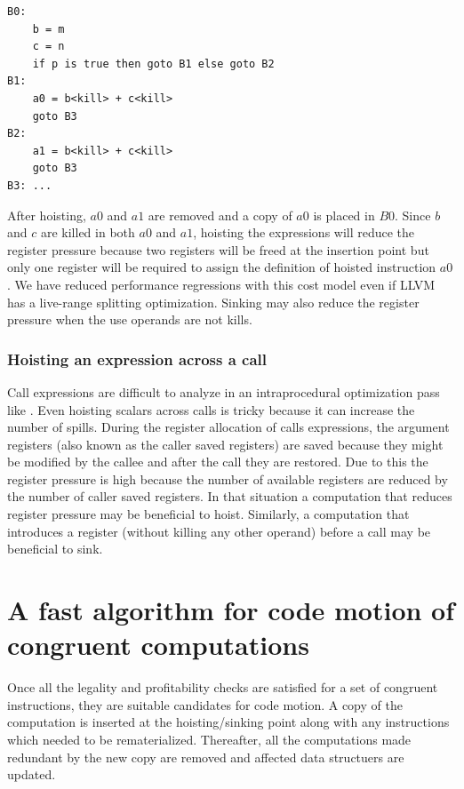 \documentclass[sigplan,10pt,review,anonymous]{acmart}\settopmatter{printfolios=true,printccs=false,printacmref=false}
\begin{document}
\begin{lstlisting}
B0:
    b = m
    c = n
    if p is true then goto B1 else goto B2
B1:
    a0 = b<kill> + c<kill>
    goto B3
B2:
    a1 = b<kill> + c<kill>
    goto B3
B3: ...
\end{lstlisting}

After hoisting, $a0$ and $a1$ are removed and a copy of $a0$ is placed in
$B0$. Since $b$ and $c$ are killed in both $a0$ and $a1$, hoisting the
expressions will reduce the register pressure because two registers will be
freed at the insertion point but only one register will be required to assign
the definition of hoisted instruction $a0$. We have reduced performance
regressions with this cost model even if LLVM has a live-range splitting
\cite{cooper1998live} optimization. Sinking may also reduce the register
pressure when the use operands are not kills.

\subsubsection{Hoisting an expression across a call}
\label{cost:across-calls}
Call expressions are difficult to analyze in an intraprocedural optimization
pass like \GCM{}. Even hoisting scalars across calls is tricky because it can
increase the number of spills. During the register allocation of calls
expressions, the argument registers (also known as the caller saved registers)
are saved because they might be modified by the callee and after the call they
are restored. Due to this the register pressure is high because the number of
available registers are reduced by the number of caller saved registers. In that
situation a computation that reduces register pressure may be beneficial to
hoist. Similarly, a computation that introduces a register (without killing any
other operand) before a call may be beneficial to sink.

\section{A fast algorithm for code motion of congruent computations}
\label{subsec:optimistic}
Once all the legality and profitability checks are satisfied for a set of
congruent instructions, they are suitable candidates for code motion. A copy of
the computation is inserted at the hoisting/sinking point along with any
instructions which needed to be rematerialized. Thereafter, all the computations
made redundant by the new copy are removed and affected data structuers are
updated.
\end{document}
